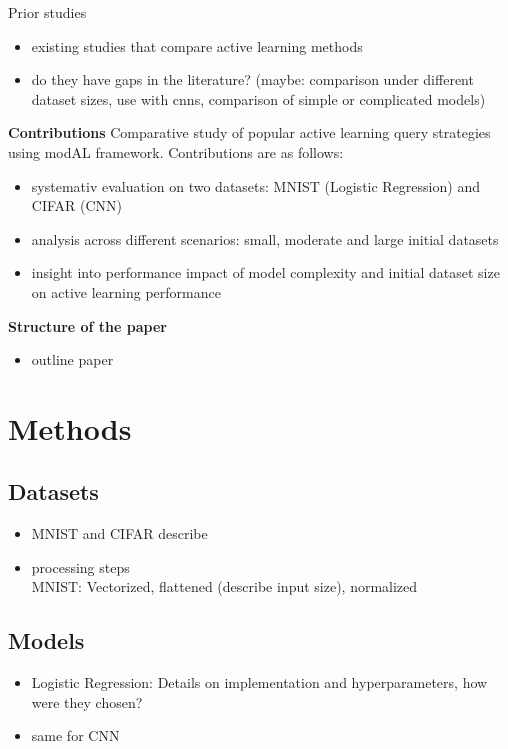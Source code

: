 \documentclass{article}
\theoremstyle{plain}
\theoremstyle{definition}
\theoremstyle{remark}
\begin{document}
Prior studies
\begin{itemize}
	\item existing studies that compare active learning methods
	\item do they have gaps in the literature? (maybe: comparison under different dataset sizes, use with cnns, comparison of simple or complicated models)
\end{itemize}

\textbf{Contributions}
Comparative study of popular active learning query strategies using modAL framework. Contributions are as follows:
\begin{itemize}
	\item systemativ evaluation on two datasets: MNIST (Logistic Regression) and CIFAR (CNN)
	\item analysis across different scenarios: small, moderate and large initial datasets
	\item insight into performance impact of model complexity and initial dataset size on active learning performance
\end{itemize}

\textbf{Structure of the paper}
\begin{itemize}
	\item outline paper
\end{itemize}

\section{Methods}\label{sec:methods}
\label{data_and_methods}
\subsection{Datasets}
\begin{itemize}
	\item MNIST and CIFAR describe
	\item processing steps \\
	MNIST: Vectorized, flattened (describe input size), normalized
\end{itemize}

\subsection{Models}
\begin{itemize}
	\item Logistic Regression: Details on implementation and hyperparameters, how were they chosen?
	\item same for CNN
\end{itemize}
\end{document}
